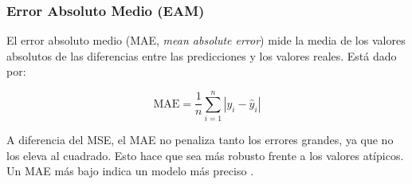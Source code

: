 \subsubsection{Error Absoluto Medio (EAM)}

El error absoluto medio (MAE, \textit{mean absolute error}) mide la media de los valores absolutos de las diferencias entre las predicciones y los valores reales. Está dado por:

\begin{equation}
    \text{MAE} = \frac{1}{n} \sum_{i=1}^{n} |y_i - \hat{y}_i|
\end{equation}

A diferencia del MSE, el MAE no penaliza tanto los errores grandes, ya que no los eleva al cuadrado. Esto hace que sea más robusto frente a los valores atípicos. Un MAE más bajo indica un modelo más preciso \cite{pajares2021aprendizaje}.

